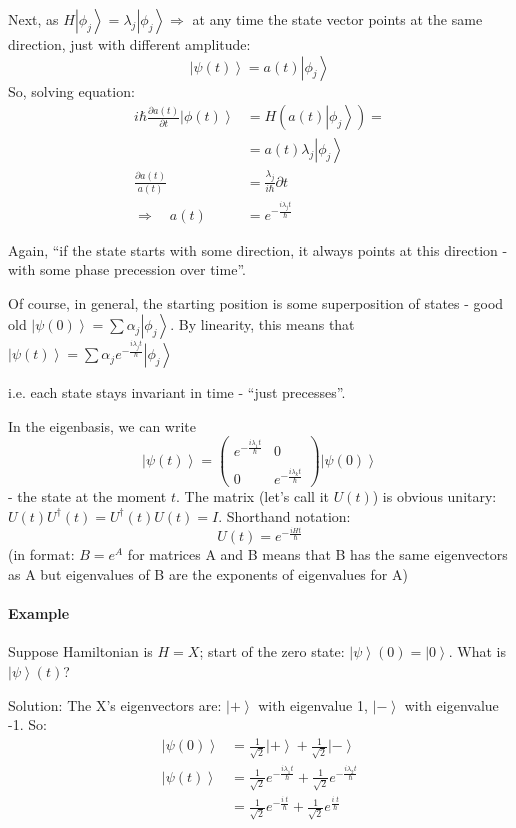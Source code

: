 \documentclass{scrartcl}
\newcommand{\ket}[1]{\left| #1 \right>} %
\begin{document}
Next, as $H \ket{\phi_j} = \lambda_j \ket{\phi_j} \Rightarrow $ at any time the
state vector points at the same direction, just with different amplitude:
$$\ket{\psi(t)} = a(t)\ket{\phi_j}$$
So, solving equation:
\begin{equation*}
  \begin{split}
    i\hbar\frac{\partial a(t)}{\partial t}\ket{\phi(t)} &= H(a(t) \ket{\phi_j})
    = \\
    &=a(t) \lambda_j \ket{\phi_j}\\
    \frac{\partial a(t)}{a(t)} &= \frac{\lambda_j}{i\hbar} \partial t\\
    \Rightarrow \quad a(t) &= e^{-\frac{i\lambda_j t}{\hbar}}
  \end{split}
\end{equation*}

Again, ``if the state starts with some direction, it always points at this
direction - with some phase precession over time''.

Of course, in general, the starting position is some superposition of states -
good old $\ket{\psi(0)} = \sum \alpha_j \ket{\phi_j}$. By linearity, this means
that $\ket{\psi(t)} = \sum \alpha_j e^{-\frac{i\lambda_j t}{\hbar}}
\ket{\phi_j}$

i.e. each state stays invariant in time - ``just precesses''.

In the eigenbasis, we can write
$$\ket{\psi(t)} =
\begin{pmatrix} e^{-\frac{i\lambda_1 t}{\hbar}} & 0 \\ \\ 0 &
  e^{-\frac{i\lambda_k t}{\hbar}} \end{pmatrix} \ket{\psi(0)}$$ - the state at
the moment $t$. The matrix (let's call it $U(t)$) is obvious unitary: $U(t)
U^\dag(t) = U^\dag(t) U(t) = I$. Shorthand notation:
$$U(t) = e^{-\frac{i H t}{\hbar}}$$
(in format: $B = e^A$ for matrices A and B means that B has the same
eigenvectors as A but eigenvalues of B are the exponents of eigenvalues for A)

\paragraph{Example}

Suppose Hamiltonian is $H = X$; start of the zero state: $\ket\psi(0) = \ket0$.
What is $\ket\psi(t)$?

Solution: The X's eigenvectors are: $\ket+$ with eigenvalue 1, $\ket-$ with
eigenvalue -1. So:
\begin{equation*} \begin{split}
    \ket{\psi(0)} &= \frac1{\sqrt2}\ket+ + \frac1{\sqrt2}\ket- \\
    \ket{\psi(t)} &= \frac1{\sqrt2}e^{-\frac{i\lambda_1 t}{\hbar}} +
    \frac1{\sqrt2}e^{-\frac{i\lambda_2 t}{\hbar}} \\
    &= \frac1{\sqrt2}e^{-\frac{i \; t}{\hbar}} + \frac1{\sqrt2}e^{\frac{i \;
        t}{\hbar}}
  \end{split} \end{equation*}
\end{document}
